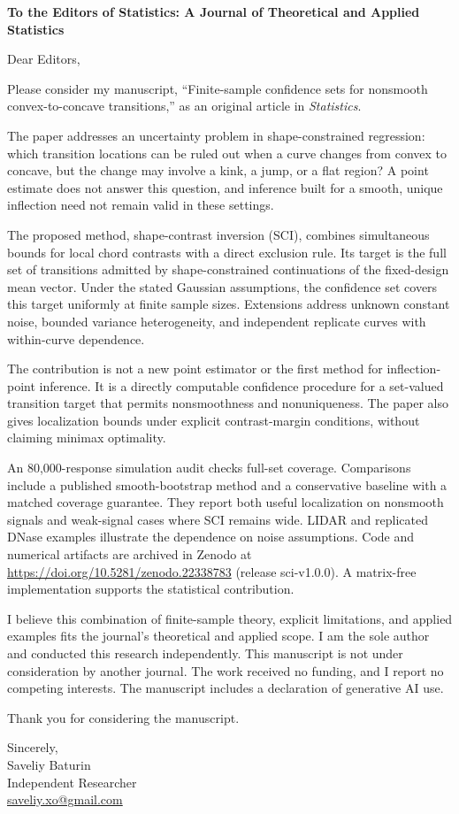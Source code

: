 \documentclass[11pt,a4paper]{article}
\begin{document}
\textbf{To the Editors of Statistics: A Journal of Theoretical and Applied Statistics}

Dear Editors,

Please consider my manuscript, ``Finite-sample confidence sets for nonsmooth
convex-to-concave transitions,'' as an original article in \emph{Statistics}.

The paper addresses an uncertainty problem in shape-constrained regression:
which transition locations can be ruled out when a curve changes from convex
to concave, but the change may involve a kink, a jump, or a flat region?
A point estimate does not answer this question, and inference built for a
smooth, unique inflection need not remain valid in these settings.

The proposed method, shape-contrast inversion (SCI), combines simultaneous
bounds for local chord contrasts with a direct exclusion rule. Its target is
the full set of transitions admitted by shape-constrained continuations of
the fixed-design mean vector. Under the stated Gaussian assumptions, the
confidence set covers this target uniformly at finite sample sizes.
Extensions address unknown constant noise, bounded variance heterogeneity,
and independent replicate curves with within-curve dependence.

The contribution is not a new point estimator or the first method for
inflection-point inference. It is a directly computable confidence procedure
for a set-valued transition target that permits nonsmoothness and nonuniqueness.
The paper also gives localization bounds under explicit contrast-margin
conditions, without claiming minimax optimality.

An 80,000-response simulation audit checks full-set coverage. Comparisons
include a published smooth-bootstrap method and a conservative baseline with
a matched coverage guarantee. They report both useful localization on
nonsmooth signals and weak-signal cases where SCI remains wide. LIDAR and
replicated DNase examples illustrate the dependence on noise assumptions.
Code and numerical artifacts are archived in Zenodo at
\url{https://doi.org/10.5281/zenodo.22338783} (release sci-v1.0.0).
A matrix-free implementation supports the statistical contribution.

I believe this combination of finite-sample theory, explicit limitations, and
applied examples fits the journal's theoretical and applied scope. I am the
sole author and conducted this research independently. This manuscript is not
under consideration by another journal. The work received no funding, and I report no competing
interests. The manuscript includes a declaration of generative AI use.

Thank you for considering the manuscript.

Sincerely,\\
Saveliy Baturin\\
Independent Researcher\\
\href{mailto:saveliy.xo@gmail.com}{saveliy.xo@gmail.com}
\end{document}
